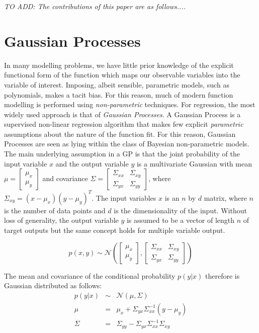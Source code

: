\documentclass[useAMS,usenatbib,fleqn]{mn2e}
\begin{document}
\textit{TO ADD: The contributions of this paper are as follows....}

\section{Gaussian Processes}
\label{sec-gaussian-process}
In many modelling problems, we have little prior knowledge of the explicit functional form of the function which maps our observable variables into the variable of interest. Imposing, albeit sensible, parametric models, such as polynomials, makes a tacit bias. For this reason, much of modern function modelling is performed using \emph{non-parametric} techniques. For regression, the most widely used approach is that of \emph{Gaussian Processes}.
A Gaussian Process is a supervised non-linear regression algorithm that makes few explicit \emph{parametric} assumptions about the nature of the function fit. For this reason, Gaussian Processes are seen as lying within the class of Bayesian non-parametric models. The main underlying assumption in a GP is that the joint probability of the input variable $x$ and the output variable $y$ is a multivariate Gaussian with mean $\mu=\begin{bmatrix} \mu_{x}\\ \mu_{y}\end{bmatrix}$ and covariance $\Sigma=\begin{bmatrix}\Sigma_{xx} & \Sigma_{xy}\\\Sigma_{yx} & \Sigma_{yy} \end{bmatrix}$, where $\Sigma_{xy}=(x-\mu_{x})(y-\mu_{y})^{T}$. The input variables $x$ is an $n$ by $d$ matrix, where $n$ is the number of data points and $d$ is the dimensionality of the input. Without loss of generality, the output variable $y$ is assumed to be a vector of length $n$ of target outputs but the same concept holds for multiple variable output.

\begin{equation}
p\left ( x,y\right) \sim \mathcal{N} \left ( \begin{bmatrix}\mu_{x}\\\mu_{y} \end{bmatrix}, \begin{bmatrix}\Sigma_{xx} & \Sigma_{xy}\\\Sigma_{yx} & \Sigma_{yy} \end{bmatrix}\right )
\end{equation}

The mean and covariance of the conditional probability $p(y|x)$ therefore is Gaussian distributed as follows:
\begin{equation}
\begin{array}{rcl}
p(y|x)		&\sim&	\mathcal{N} \left ( \mu, \Sigma \right )\\
\mu		&=&		\mu_{x}+\Sigma_{yx}\Sigma_{xx}^{-1}\left ( y-\mu_{y}\right )\\
\Sigma		&=&		\Sigma_{yy}-\Sigma_{yx}\Sigma_{xx}^{-1}\Sigma_{xy}
\end{array}
\end{equation}
\end{document}
